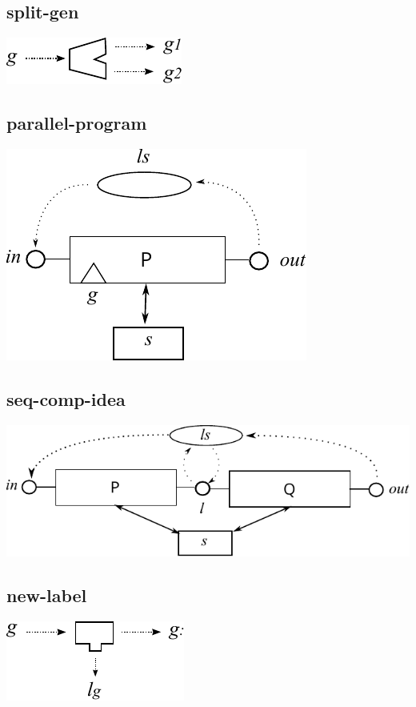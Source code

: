 \subsection{split-gen}
\includegraphics{images/split-gen}

\subsection{parallel-program}
\includegraphics{images/parallel-program}

\subsection{seq-comp-idea}
\includegraphics{images/seq-comp-idea}

\subsection{new-label}
\includegraphics{images/new-label}

